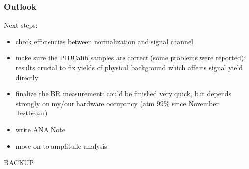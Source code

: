 \documentclass[]{beamer}
\begin{document}
\begin{frame}
\frametitle{Outlook}

Next steps:

\begin{itemize}

\item check efficiencies between normalization and signal channel

\item make sure the PIDCalib samples are correct (some problems were reported): results crucial to fix yields of physical background which affects signal yield directly 

\item finalize the BR measurement: could be finished very quick, but depends strongly on my/our hardware occupancy (atm $99\%$ since November Testbeam) 

\item write ANA Note
			
\item move on to amplitude analysis 


\end{itemize}

\end{frame}

\appendix 
\addtocounter{framenumber}{-1} 

\begin{frame}
\thispagestyle{empty}
\bfseries\Huge

\begin{center}
BACKUP
\end{center}

\normalfont

\end{frame}
\end{document}
